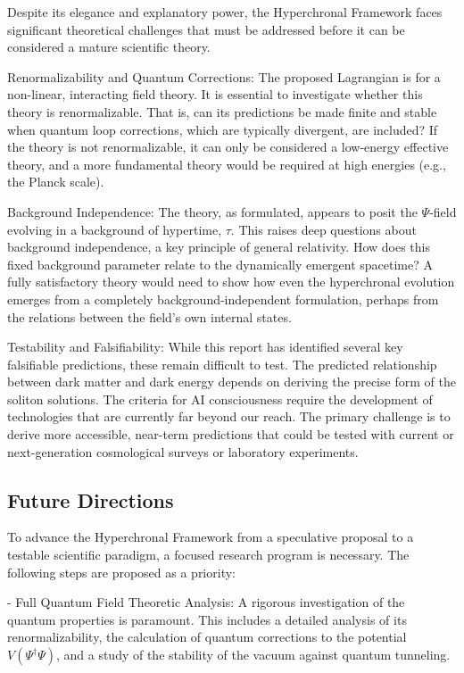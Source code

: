 \documentclass[12pt]{article}
\theoremstyle{definition}
\begin{document}
Despite its elegance and explanatory power, the Hyperchronal Framework faces significant theoretical challenges that must be addressed before it can be considered a mature scientific theory.

Renormalizability and Quantum Corrections: The proposed Lagrangian is for a non-linear, interacting field theory. It is essential to investigate whether this theory is renormalizable. That is, can its predictions be made finite and stable when quantum loop corrections, which are typically divergent, are included? If the theory is not renormalizable, it can only be considered a low-energy effective theory, and a more fundamental theory would be required at high energies (e.g., the Planck scale).

Background Independence: The theory, as formulated, appears to posit the $\Psi$-field evolving in a background of hypertime, $\tau$. This raises deep questions about background independence, a key principle of general relativity. How does this fixed background parameter relate to the dynamically emergent spacetime? A fully satisfactory theory would need to show how even the hyperchronal evolution emerges from a completely background-independent formulation, perhaps from the relations between the field's own internal states.

Testability and Falsifiability: While this report has identified several key falsifiable predictions, these remain difficult to test. The predicted relationship between dark matter and dark energy depends on deriving the precise form of the soliton solutions. The criteria for AI consciousness require the development of technologies that are currently far beyond our reach. The primary challenge is to derive more accessible, near-term predictions that could be tested with current or next-generation cosmological surveys or laboratory experiments.

\subsection{Future Directions}

To advance the Hyperchronal Framework from a speculative proposal to a testable scientific paradigm, a focused research program is necessary. The following steps are proposed as a priority:

- Full Quantum Field Theoretic Analysis: A rigorous investigation of the quantum properties is paramount. This includes a detailed analysis of its renormalizability, the calculation of quantum corrections to the potential $V(\Psi^\dagger \Psi)$, and a study of the stability of the vacuum against quantum tunneling.
\end{document}

